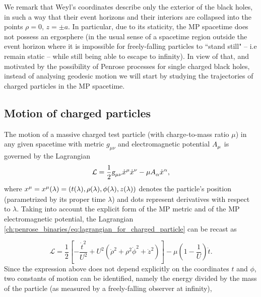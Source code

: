 We remark that Weyl's coordinates describe only the exterior of the black holes, in such a way that their event horizons and their interiors are collapsed into the points $\rho=0, \, z=\pm a$. In particular, due to its staticity, the MP spacetime does not possess an ergosphere (in the usual sense of a spacetime region outside the event horizon where it is impossible for freely-falling particles to ``stand still" -- i.e remain static -- while still being able to escape to infinity). In view of that, and motivated by the possibility of Penrose processes for single charged black holes, instead of analysing geodesic motion we will start by studying the trajectories of charged particles in the MP spacetime.

\subsection{Motion of charged particles}

The motion of a massive charged test particle (with charge-to-mass ratio $\mu$) in any given spacetime with metric $g_{\mu \nu}$ and electromagnetic potential $\tens{A}{}{\mu}$ is governed by the Lagrangian
\begin{equation}
  \mathcal{L} = \frac{1}{2}\mtrtens{\mu}{\nu}\tens{\dot{x}}{\mu}{}\tens{\dot{x}}{\nu}{} - \mu \tens{A}{}{\alpha}\tens{\dot{x}}{\alpha}{},
  \label{ch:penrose_binaries/eq:lagrangian_for_charged_particle}
\end{equation}
%
where $\tens{x}{\mu}{} = \tens{x}{\mu}{}(\lambda) =  \left(t(\lambda), \rho(\lambda), \phi(\lambda), z(\lambda)\right)$ denotes the particle's position (parametrized by its proper time $\lambda$) and dots represent derivatives with respect to $\lambda$. Taking into account the explicit form of the MP metric and of the MP electromagnetic potential, the Lagrangian \eqref{ch:penrose_binaries/eq:lagrangian_for_charged_particle} can be recast as~\cite{RYZNER2015}

\begin{equation}
  \mathcal{L} = \frac{1}{2}\left[-\frac{\dot{t}^2}{U^2} + U^2\left( \dot{\rho}^2 + \rho^2\dot{\phi}^2 + \dot{z}^2 \right) \right] - \mu\left(1-\frac{1}{U}\right)\dot{t}.
  \label{ch:penrose_binaries/eq:explicit_lagrangian_for_charged_particle}
\end{equation}
%
Since the expression above does not depend explicitly on the coordinates $t$ and $\phi$, two constants of motion can be identified, namely the energy divided by the mass of the particle (as measured by a freely-falling observer at infinity),

